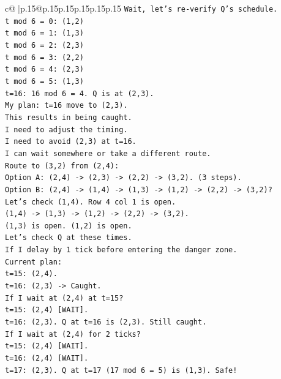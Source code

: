 \documentclass{article}
\begin{document}
{\begin{supertabular}{c@{$\;$}|p{.15\linewidth}@{}p{.15\linewidth}p{.15\linewidth}p{.15\linewidth}p{.15\linewidth}p{.15\linewidth}}
{{{\texttt{Wait, let's re{-}verify Q's schedule.} \\
\texttt{t mod 6 = 0: (1,2)} \\
\texttt{t mod 6 = 1: (1,3)} \\
\texttt{t mod 6 = 2: (2,3)} \\
\texttt{t mod 6 = 3: (2,2)} \\
\texttt{t mod 6 = 4: (2,3)} \\
\texttt{t mod 6 = 5: (1,3)} \\
\texttt{t=16: 16 mod 6 = 4. Q is at (2,3).} \\
\texttt{My plan: t=16 move to (2,3).} \\
\texttt{This results in being caught.} \\
\texttt{I need to adjust the timing.} \\
\texttt{I need to avoid (2,3) at t=16.} \\
\texttt{I can wait somewhere or take a different route.} \\
\texttt{Route to (3,2) from (2,4):} \\
\texttt{Option A: (2,4) {-}> (2,3) {-}> (2,2) {-}> (3,2). (3 steps).} \\
\texttt{Option B: (2,4) {-}> (1,4) {-}> (1,3) {-}> (1,2) {-}> (2,2) {-}> (3,2)?} \\
\texttt{Let's check (1,4). Row 4 col 1 is open.} \\
\texttt{(1,4) {-}> (1,3) {-}> (1,2) {-}> (2,2) {-}> (3,2).} \\
\texttt{(1,3) is open. (1,2) is open.} \\
\texttt{Let's check Q at these times.} \\
\texttt{If I delay by 1 tick before entering the danger zone.} \\
\texttt{Current plan:} \\
\texttt{t=15: (2,4).} \\
\texttt{t=16: (2,3) {-}> Caught.} \\
\texttt{If I wait at (2,4) at t=15?} \\
\texttt{t=15: (2,4) {[}WAIT{]}.} \\
\texttt{t=16: (2,3). Q at t=16 is (2,3). Still caught.} \\
\texttt{If I wait at (2,4) for 2 ticks?} \\
\texttt{t=15: (2,4) {[}WAIT{]}.} \\
\texttt{t=16: (2,4) {[}WAIT{]}.} \\
\texttt{t=17: (2,3). Q at t=17 (17 mod 6 = 5) is (1,3). Safe!} \\
}}}
\end{supertabular}}
\end{document}
